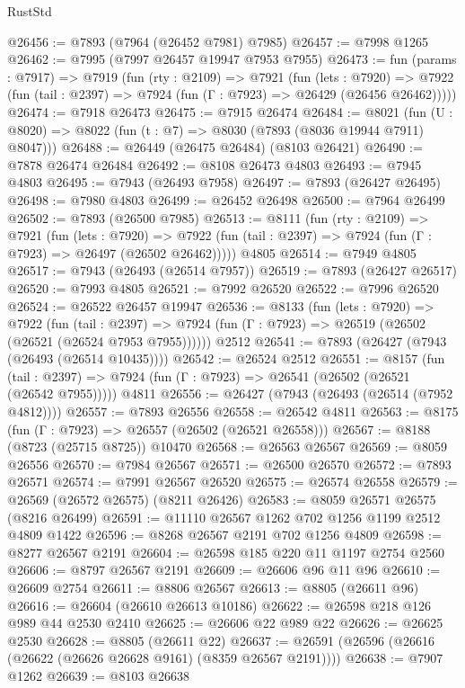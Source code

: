 \begin{lexlean}{RustStd}
\begin{coremodule}
@26456 := @7893 (@7964 (@26452 @7981) @7985)
@26457 := @7998 @1265
@26462 := @7995 (@7997 @26457 @19947 @7953 @7955)
@26473 := fun (params : @7917) =>
  @7919
    (fun (rty : @2109) =>
    @7921
      (fun (lets : @7920) =>
      @7922 (fun (tail : @2397) => @7924 (fun (Γ : @7923) => @26429 (@26456 @26462)))))
@26474 := @7918 @26473
@26475 := @7915 @26474
@26484 := @8021
    (fun (U : @8020) => @8022 (fun (t : @7) => @8030 (@7893 (@8036 @19944 @7911) @8047)))
@26488 := @26449 (@26475 @26484) (@8103 @26421)
@26490 := @7878 @26474 @26484
@26492 := @8108 @26473 @4803
@26493 := @7945 @4803
@26495 := @7943 (@26493 @7958)
@26497 := @7893 (@26427 @26495)
@26498 := @7980 @4803
@26499 := @26452 @26498
@26500 := @7964 @26499
@26502 := @7893 (@26500 @7985)
@26513 := @8111
    (fun (rty : @2109) =>
    @7921
      (fun (lets : @7920) =>
      @7922 (fun (tail : @2397) => @7924 (fun (Γ : @7923) => @26497 (@26502 @26462)))))
    @4805
@26514 := @7949 @4805
@26517 := @7943 (@26493 (@26514 @7957))
@26519 := @7893 (@26427 @26517)
@26520 := @7993 @4805
@26521 := @7992 @26520
@26522 := @7996 @26520
@26524 := @26522 @26457 @19947
@26536 := @8133
    (fun (lets : @7920) =>
    @7922
      (fun (tail : @2397) =>
      @7924 (fun (Γ : @7923) => @26519 (@26502 (@26521 (@26524 @7953 @7955))))))
    @2512
@26541 := @7893 (@26427 (@7943 (@26493 (@26514 @10435))))
@26542 := @26524 @2512
@26551 := @8157
    (fun (tail : @2397) => @7924 (fun (Γ : @7923) => @26541 (@26502 (@26521 (@26542 @7955)))))
    @4811
@26556 := @26427 (@7943 (@26493 (@26514 (@7952 @4812))))
@26557 := @7893 @26556
@26558 := @26542 @4811
@26563 := @8175 (fun (Γ : @7923) => @26557 (@26502 (@26521 @26558)))
@26567 := @8188 (@8723 (@25715 @8725)) @10470
@26568 := @26563 @26567
@26569 := @8059 @26556
@26570 := @7984 @26567
@26571 := @26500 @26570
@26572 := @7893 @26571
@26574 := @7991 @26567 @26520
@26575 := @26574 @26558
@26579 := @26569 (@26572 @26575) (@8211 @26426)
@26583 := @8059 @26571 @26575 (@8216 @26499)
@26591 := @11110 @26567 @1262 @702 @1256 @1199 @2512 @4809 @1422
@26596 := @8268 @26567 @2191 @702 @1256 @4809
@26598 := @8277 @26567 @2191
@26604 := @26598 @185 @220 @11 @1197 @2754 @2560
@26606 := @8797 @26567 @2191
@26609 := @26606 @96 @11 @96
@26610 := @26609 @2754
@26611 := @8806 @26567
@26613 := @8805 (@26611 @96)
@26616 := @26604 (@26610 @26613 @10186)
@26622 := @26598 @218 @126 @989 @44 @2530 @2410
@26625 := @26606 @22 @989 @22
@26626 := @26625 @2530
@26628 := @8805 (@26611 @22)
@26637 := @26591 (@26596 (@26616 (@26622 (@26626 @26628 @9161) (@8359 @26567 @2191))))
@26638 := @7907 @1262
@26639 := @8103 @26638

\end{coremodule}
\end{lexlean}
